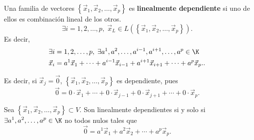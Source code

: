 \begin{fdefinition}[]
\normalfont Una familia de vectores  $\displaystyle\left\{ \vec{x}_{1}, \vec{x}_{2}, \ldots, \vec{x}_{p}\right\} $ es \textbf{linealmente dependiente} si uno de ellos es combinación lineal de los otros. 
\[\exists i = 1, 2, \ldots, p, \; \vec{x}_{L} \in L\left(\left\{ \vec{x}_{1}, \vec{x}_{2}, \ldots, \vec{x}_{p}\right\}\right)  .\]
Es decir, 
\[
\begin{split}
& \exists i = 1, 2, \ldots, p,\; \exists a^{1}, a^{2}, \ldots, a^{i-1}, a^{i+1}, \ldots, a^{p} \in \K \\
& \vec{x}_{i} = a^{1}\vec{x}_{1} + \cdots + a^{i-1}\vec{x}_{i-1} + a^{i+1}\vec{x}_{i+1} + \cdots + a^{p}\vec{x}_{p}..
\end{split}
\]

Es decir, si $\displaystyle \vec{x}_{j} = \vec{0} $, $\displaystyle \left\{ \vec{x}_{1}, \vec{x}_{2}, \ldots, \vec{x}_{p}\right\} $ es dependiente, pues 
\[\vec{0} = 0 \cdot \vec{x}_{1} + \cdots + 0 \cdot \vec{x}_{j-1} + 0 \cdot \vec{x}_{j+1} + \cdots + 0 \cdot \vec{x}_{p}  .\]
\end{fdefinition}

\begin{ftheorem}[]
\normalfont Sea $\displaystyle \left\{ \vec{x}_{1}, \vec{x}_{2}, \ldots, \vec{x}_{p}\right\} \subset V $. Son linealmente dependientes si y solo si $\displaystyle \exists a^{1}, a^{2}, \ldots, a^{p} \in \K $ no todos nulos tales que 
\[\vec{0} = a^{1}\vec{x}_{1} + a^{2}\vec{x}_{2} + \cdots + a^{p}\vec{x}_{p} .\]
\end{ftheorem}

